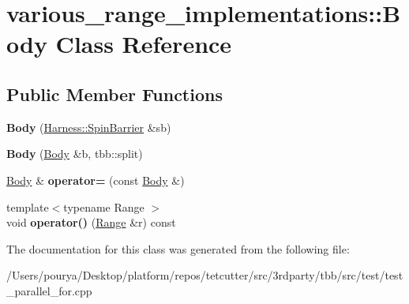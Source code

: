 \hypertarget{classvarious__range__implementations_1_1Body}{}\section{various\+\_\+range\+\_\+implementations\+:\+:Body Class Reference}
\label{classvarious__range__implementations_1_1Body}
\subsection*{Public Member Functions}
\begin{DoxyCompactItemize}
\item 
\hypertarget{classvarious__range__implementations_1_1Body_a20451311f8f59f393a3dd2f42f23dc69}{}{\bfseries Body} (\hyperlink{classHarness_1_1SpinBarrier}{Harness\+::\+Spin\+Barrier} \&sb)\label{classvarious__range__implementations_1_1Body_a20451311f8f59f393a3dd2f42f23dc69}

\item 
\hypertarget{classvarious__range__implementations_1_1Body_a6f4816b6fcf2bbab18fc4864344dda36}{}{\bfseries Body} (\hyperlink{classvarious__range__implementations_1_1Body}{Body} \&b, tbb\+::split)\label{classvarious__range__implementations_1_1Body_a6f4816b6fcf2bbab18fc4864344dda36}

\item 
\hypertarget{classvarious__range__implementations_1_1Body_a100a485ff7afbb5a4647c3e13248eefa}{}\hyperlink{classvarious__range__implementations_1_1Body}{Body} \& {\bfseries operator=} (const \hyperlink{classvarious__range__implementations_1_1Body}{Body} \&)\label{classvarious__range__implementations_1_1Body_a100a485ff7afbb5a4647c3e13248eefa}

\item 
\hypertarget{classvarious__range__implementations_1_1Body_ab96fa266244dd8973c72406f6518082d}{}{\footnotesize template$<$typename Range $>$ }\\void {\bfseries operator()} (\hyperlink{classtbb_1_1blocked__range}{Range} \&r) const \label{classvarious__range__implementations_1_1Body_ab96fa266244dd8973c72406f6518082d}

\end{DoxyCompactItemize}


The documentation for this class was generated from the following file\+:\begin{DoxyCompactItemize}
\item 
/\+Users/pourya/\+Desktop/platform/repos/tetcutter/src/3rdparty/tbb/src/test/test\+\_\+parallel\+\_\+for.\+cpp\end{DoxyCompactItemize}
